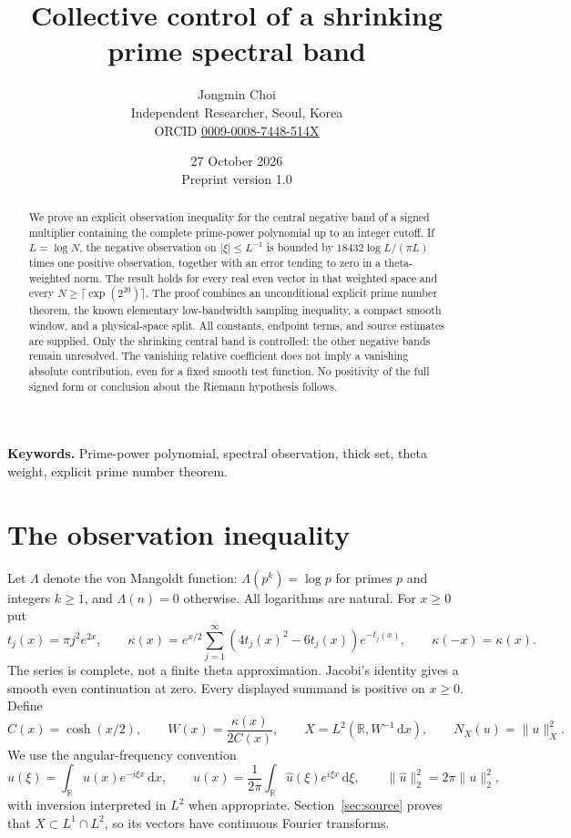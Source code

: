 \documentclass[11pt]{article}
\title{Collective control of a shrinking prime spectral band}
\author{Jongmin Choi\\[3pt]\small Independent Researcher, Seoul, Korea\\\small ORCID \href{https://orcid.org/0009-0008-7448-514X}{0009-0008-7448-514X}}
\date{27 October 2026\\\small Preprint version 1.0}
\theoremstyle{remark}\newtheorem{remark}[theorem]{Remark}
\newcommand{\R}{\mathbb R}
\newcommand{\dd}{\,\mathrm d}
\newcommand{\norm}[1]{\lVert #1\rVert}
\newcommand{\NX}{N_X}
\numberwithin{equation}{section}
\begin{document}
\maketitle
\begin{abstract}
We prove an explicit observation inequality for the central negative band of a signed multiplier containing the complete prime-power polynomial up to an integer cutoff. If $L=\log N$, the negative observation on $|\xi|\le L^{-1}$ is bounded by $18432\log L/(\pi L)$ times one positive observation, together with an error tending to zero in a theta-weighted norm. The result holds for every real even vector in that weighted space and every $N\ge\lceil\exp(2^{20})\rceil$. The proof combines an unconditional explicit prime number theorem, the known elementary low-bandwidth sampling inequality, a compact smooth window, and a physical-space split. All constants, endpoint terms, and source estimates are supplied. Only the shrinking central band is controlled: the other negative bands remain unresolved. The vanishing relative coefficient does not imply a vanishing absolute contribution, even for a fixed smooth test function. No positivity of the full signed form or conclusion about the Riemann hypothesis follows.
\end{abstract}
\noindent\textbf{Keywords.} Prime-power polynomial, spectral observation, thick set, theta weight, explicit prime number theorem.

\section{The observation inequality}\label{sec:statement}
Let $\Lambda$ denote the von Mangoldt function: $\Lambda(p^k)=\log p$ for primes $p$ and integers $k\ge1$, and $\Lambda(n)=0$ otherwise. All logarithms are natural. For $x\ge0$ put
\begin{equation}\label{eq:kappa}
 t_j(x)=\pi j^2e^{2x},\qquad
 \kappa(x)=e^{x/2}\sum_{j=1}^{\infty}(4t_j(x)^2-6t_j(x))e^{-t_j(x)},
 \qquad \kappa(-x)=\kappa(x).
\end{equation}
The series is complete, not a finite theta approximation. Jacobi's identity gives a smooth even continuation at zero. Every displayed summand is positive on $x\ge0$. Define
\begin{equation}\label{eq:X}
 C(x)=\cosh(x/2),\qquad W(x)=\frac{\kappa(x)}{2C(x)},\qquad
 X=L^2(\R,W^{-1}\dd x),\qquad \NX(u)=\norm{u}_X^2.
\end{equation}
We use the angular-frequency convention
\begin{equation}\label{eq:fourier}
 \widehat u(\xi)=\int_\R u(x)e^{-i\xi x}\dd x,
 \qquad u(x)=\frac1{2\pi}\int_\R\widehat u(\xi)e^{i\xi x}\dd\xi,
 \qquad \norm{\widehat u}_2^2=2\pi\norm{u}_2^2,
\end{equation}
with inversion interpreted in $L^2$ when appropriate. Section~\ref{sec:source} proves that $X\subset L^1\cap L^2$, so its vectors have continuous Fourier transforms.
\end{document}
